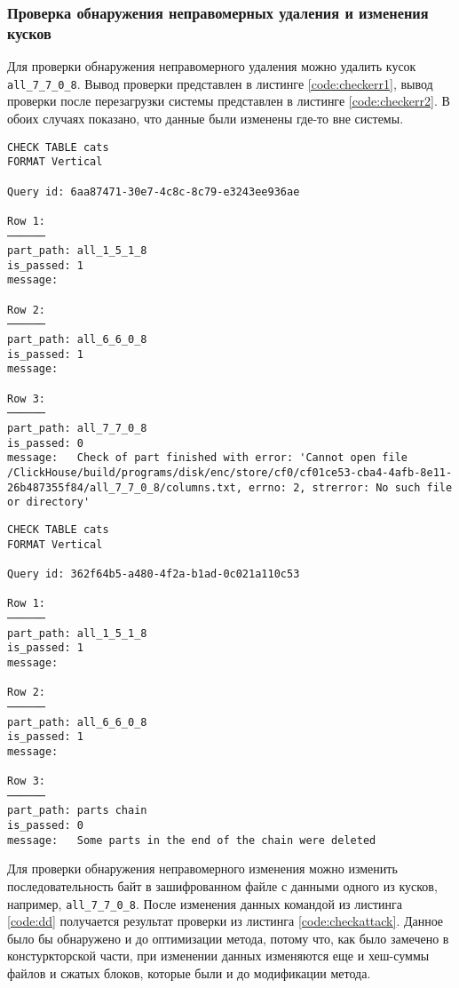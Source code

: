 \subsubsection{Проверка обнаружения неправомерных удаления и изменения кусков}

Для проверки обнаружения неправомерного удаления можно удалить кусок \texttt{all\_7\_7\_0\_8}. Вывод проверки представлен в листинге \ref{code:checkerr1}, вывод проверки после перезагрузки системы представлен в листинге \ref{code:checkerr2}. В обоих случаях показано, что данные были изменены где-то вне системы.

\pagebreak

\begin{lstlisting}[label=code:checkerr1, caption={Вывод системы после неправомерного удаления куска.}]
CHECK TABLE cats
FORMAT Vertical

Query id: 6aa87471-30e7-4c8c-8c79-e3243ee936ae

Row 1:
──────
part_path: all_1_5_1_8
is_passed: 1
message:

Row 2:
──────
part_path: all_6_6_0_8
is_passed: 1
message:

Row 3:
──────
part_path: all_7_7_0_8
is_passed: 0
message:   Check of part finished with error: 'Cannot open file /ClickHouse/build/programs/disk/enc/store/cf0/cf01ce53-cba4-4afb-8e11-26b487355f84/all_7_7_0_8/columns.txt, errno: 2, strerror: No such file or directory'
\end{lstlisting}

\pagebreak

\begin{lstlisting}[label=code:checkerr2, caption={Вывод системы после неправомерного удаления куска после перезагрузки системы.}]
CHECK TABLE cats
FORMAT Vertical

Query id: 362f64b5-a480-4f2a-b1ad-0c021a110c53

Row 1:
──────
part_path: all_1_5_1_8
is_passed: 1
message:

Row 2:
──────
part_path: all_6_6_0_8
is_passed: 1
message:

Row 3:
──────
part_path: parts chain
is_passed: 0
message:   Some parts in the end of the chain were deleted
\end{lstlisting}

Для проверки обнаружения неправомерного изменения можно изменить последовательность байт в зашифрованном файле с данными одного из кусков, например, \texttt{all\_7\_7\_0\_8}. После изменения данных командой из листинга \ref{code:dd} получается результат проверки из листинга \ref{code:checkattack}. Данное было бы обнаружено и до оптимизации метода, потому что, как было замечено в констуркторской части, при изменении данных изменяются еще и хеш-суммы файлов и сжатых блоков, которые были и до модификации метода.

